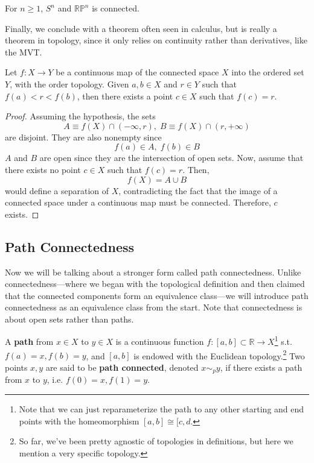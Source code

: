   \begin{example}
    For $n \geq 1$, $S^n$ and $\mathbb{RP}^n$ is connected. 
  \end{example}

  Finally, we conclude with a theorem often seen in calculus, but is really a theorem in topology, since it only relies on continuity rather than derivatives, like the MVT. 

  \begin{theorem}
    Let $f: X \longrightarrow Y$ be a continuous map of the connected space $X$ into the ordered set $Y$, with the order topology. Given $a, b \in X$ and $r \in Y$ such that $f(a)<r<f(b)$, then there exists a point $c \in X$ such that $f(c) = r$. 
  \end{theorem}
  \begin{proof}
    Assuming the hypothesis, the sets 
    \begin{equation}
      A \equiv f(X) \cap (-\infty, r), \; B \equiv f(X) \cap (r, +\infty)
    \end{equation}
    are disjoint. They are also nonempty since 
    \begin{equation}
      f(a) \in A, \; f(b) \in B
    \end{equation}
    $A$ and $B$ are open since they are the intersection of open sets. Now, assume that there exists no point $c \in X$ such that $f(c) = r$. Then, 
    \begin{equation}
      f(X) = A \cup B
    \end{equation}
    would define a separation of $X$, contradicting the fact that the image of a connected space under a continuous map must be connected. Therefore, $c$ exists. 
  \end{proof}  

\subsection{Path Connectedness} 

  Now we will be talking about a stronger form called path connectedness. Unlike connectedness---where we began with the topological definition and then claimed that the connected components form an equivalence class---we will introduce path connectedness as an equivalence class from the start. Note that connectedness is about open sets rather than paths. 

  \begin{definition}[Path]
    A \textbf{path} from $x \in X$ to $y \in X$ is a continuous function $f: [a, b] \subset \mathbb{R} \rightarrow X$\footnote{Note that we can just reparameterize the path to any other starting and end points with the homeomorphism $[a, b] \cong [c, d$.} s.t. $f(a) = x, f(b) = y$, and $[a, b]$ is endowed with the Euclidean topology.\footnote{So far, we've been pretty agnostic of topologies in definitions, but here we mention a very specific topology.} Two points $x, y$ are said to be \textbf{path connected}, denoted $x \sim_p y$, if there exists a path from $x$ to $y$, i.e. $f(0) = x, f(1) = y$.
  \end{definition} 

